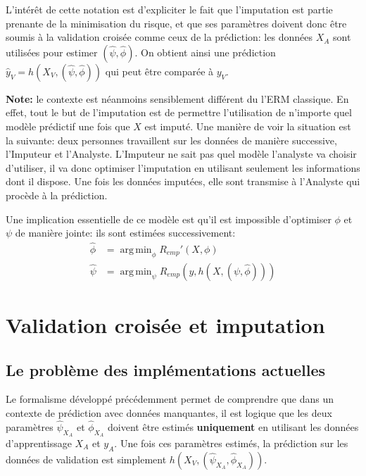 \documentclass[12pt, a4paper]{article}
\DeclareMathOperator*{\argmin}{arg\,min}
\begin{document}
L'intérêt de cette notation est d'expliciter le fait que l'imputation est partie prenante de la minimisation du risque, et que ses paramètres doivent donc être soumis à la validation croisée comme ceux de la prédiction: les données $X_A$ sont utilisées pour estimer $(\hat{\psi}, \hat{\phi})$. On obtient ainsi une prédiction $\hat{y}_V = h(X_V, (\hat{\psi}, \hat{\phi}))$ qui peut être comparée à $y_V$. 

\textbf{Note:} le contexte est néanmoins sensiblement différent du l'ERM classique. En effet, tout le but de l'imputation est de permettre l'utilisation de n'importe quel modèle  prédictif une fois que $X$ est imputé. Une manière de voir la situation est la suivante: deux personnes travaillent sur les données de manière successive, l'Imputeur et l'Analyste. L'Imputeur ne sait pas quel modèle l'analyste va choisir d'utiliser, il va donc optimiser l'imputation en utilisant seulement les informations dont il dispose. Une fois les données imputées, elle sont transmise à l'Analyste qui procède à la prédiction.

Une implication essentielle de ce modèle est qu'il est impossible d'optimiser $\phi$ et $\psi$ de manière jointe: ils sont estimées successivement:
\begin{align*}
\hat{\phi} &= \argmin_{\phi} R_{emp}'(X, \phi) \\
\hat{\psi} &= \argmin_{\psi} R_{emp}(y, h(X, (\psi, \hat{\phi})))
\end{align*}

\section{Validation croisée et imputation}
\subsection{Le problème des implémentations actuelles}
Le formalisme développé précédemment permet de comprendre que dans un contexte de prédiction avec données manquantes, il est logique que les deux paramètres $\hat{\psi}_{X_A}$ et $\hat{\phi}_{X_A}$ doivent être estimés \textbf{uniquement} en utilisant les données d'apprentissage $X_A$ et $y_A$. Une fois ces paramètres estimés, la prédiction sur les données de validation est simplement $h(X_V,(\hat{\psi}_{X_A},\hat{\phi}_{X_A}))$. 
\end{document}
